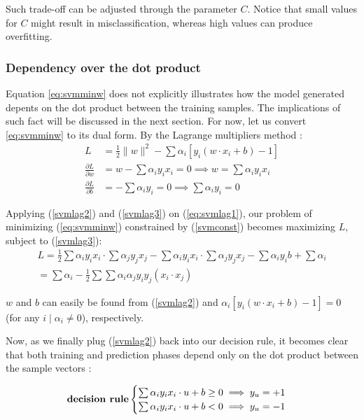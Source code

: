 Such trade-off can be adjusted through the parameter $C$. Notice that small values for $C$ might result in misclassification, whereas high values can produce overfitting.

\subsubsection{Dependency over the dot product}

Equation \ref{eq:svmminw} does not explicitly illustrates how the model generated depents on the dot product between the training samples. The implications of such fact will be discussed in the next section. For now, let us convert \ref{eq:svmminw} to its dual form. By the Lagrange multipliers method \cite{mitsvm}:
\begin{align} \label{eq:svmlag1}
	L &= \frac{1}{2}\|w\|^2 - \sum \alpha_i[y_i(w \cdot x_i +b) -1] \\
	\label{svmlag2}
	\frac{\partial L}{\partial w} &= w -\sum\alpha_i y_i x_i = 0 \implies w = \sum\alpha_i y_i x_i \\
	\label{svmlag3}
	\frac{\partial L}{\partial b} &= -\sum\alpha_i y_i = 0 \implies \sum\alpha_i y_i = 0
\end{align}

Applying (\ref{svmlag2}) and (\ref{svmlag3}) on (\ref{eq:svmlag1}), our problem of minimizing (\ref{eq:svmminw}) constrained by (\ref{svmconst}) becomes maximizing $L$, subject to (\ref{svmlag3}):
\begin{gather*}
L = \frac{1}{2}\sum\alpha_i y_i x_i \cdot \sum\alpha_j y_j x_j
- \sum \alpha_i y_i x_i \cdot \sum \alpha_j y_j x_j
- \sum \alpha_i y_i b + \sum \alpha_i \\
= \sum\alpha_i -\frac{1}{2}\sum\sum\alpha_i\alpha_j y_i y_j (x_i \cdot x_j)
\end{gather*}

$w$ and $b$ can easily be found from (\ref{svmlag2}) and $\alpha_i[y_i(w \cdot x_i + b) - 1] = 0$ (for any $i \mid \alpha_i \ne 0$), respectively.

Now, as we finally plug (\ref{svmlag2}) back into our decision rule, it becomes clear that both training and prediction phases depend only on the dot product between the sample vectors \cite{mitsvm}:

$$\text{\textbf{decision rule}} \begin{cases}
	\sum\alpha_i y_i x_i \cdot u +b \geq 0 \implies y_u=+1\\
	\sum\alpha_i y_i x_i \cdot u +b < 0 \implies y_u=-1\\
\end{cases}$$

